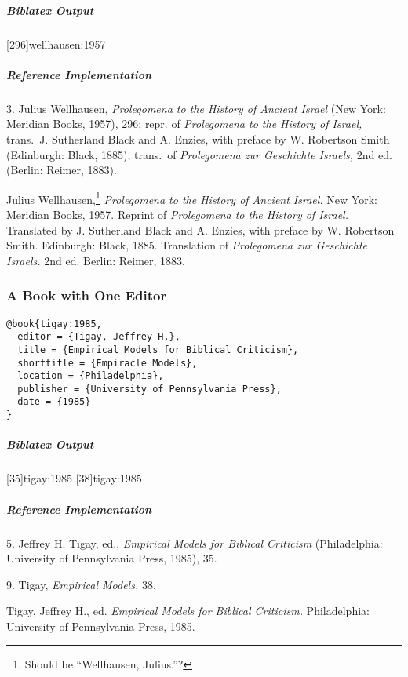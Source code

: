 \documentclass[a4paper]{article}
\newenvironment{biboutput}{%
  \subparagraph{Biblatex Output}
}{\color{black}}
\newenvironment{refimp}{%
  \subparagraph{Reference Implementation}
  \color{reference-colour}
  \rm
}{\par\color{black}}
\begin{document}
\begin{biboutput}
  [296]{wellhausen:1957}
\end{biboutput}

\begin{refimp}
  3. Julius Wellhausen, \emph{Prolegomena to the History of Ancient Israel}
  (New York: Meridian Books, 1957), 296; repr. of \emph{Prolegomena to the
  History of Israel,} trans.\ J. Sutherland Black and A. Enzies, with preface
  by W. Robertson Smith (Edinburgh: Black, 1885); trans.\ of \emph{Prolegomena
  zur Geschichte Israels,} 2nd ed. (Berlin: Reimer, 1883).

  \hangindent\bibindent Julius Wellhausen,\footnote{Should be “Wellhausen,
  Julius.”?} \emph{Prolegomena to the History of Ancient Israel.} New York:
  Meridian Books, 1957. Reprint of \emph{Prolegomena to the History of
  Israel.} Translated by J. Sutherland Black and A. Enzies, with preface by W.
  Robertson Smith. Edinburgh: Black, 1885. Translation of \emph{Prolegomena
  zur Geschichte Israels.} 2nd ed. Berlin: Reimer, 1883.
\end{refimp}

\subsubsection{A Book with One Editor}

\begin{lstlisting}
@book{tigay:1985,
  editor = {Tigay, Jeffrey H.},
  title = {Empirical Models for Biblical Criticism},
  shorttitle = {Empiracle Models},
  location = {Philadelphia},
  publisher = {University of Pennsylvania Press},
  date = {1985}
}
\end{lstlisting}  

\begin{biboutput}
  [35]{tigay:1985}
  [38]{tigay:1985}
\end{biboutput}

\begin{refimp}
  5. Jeffrey H. Tigay, ed., \emph{Empirical Models for Biblical Criticism}
  (Philadelphia: University of Pennsylvania Press, 1985), 35.

  9. Tigay, \emph{Empirical Models,} 38.

  \hangindent\bibindent Tigay, Jeffrey H., ed. \emph{Empirical Models for
  Biblical Criticism.} Philadelphia: University of Pennsylvania Press,
  1985.
\end{refimp}
\end{document}
